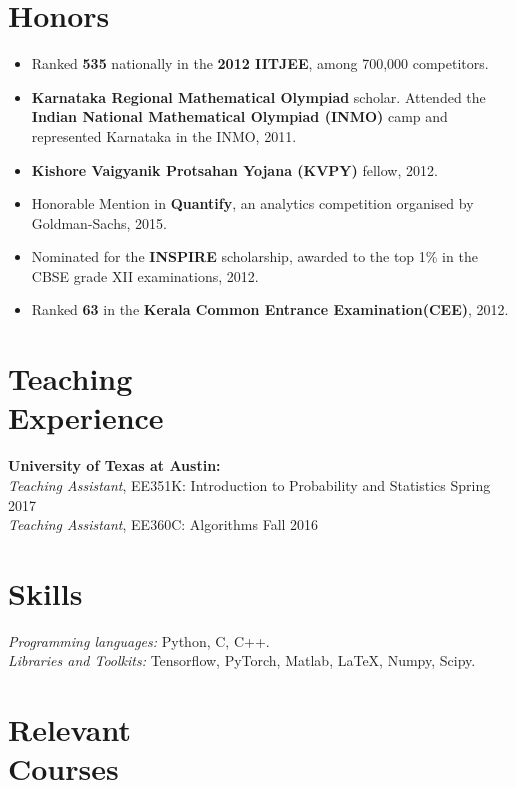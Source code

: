 \documentclass[margin, 11pt]{res} %
\begin{document}
\begin{resume}

\section{\large Honors}
\begin{itemize}\itemsep -2pt
	\item Ranked {\bf 535} nationally in the {\bf 2012 IITJEE}, among 700,000 competitors.
	\item {\bf Karnataka Regional Mathematical Olympiad} scholar. Attended the {\bf Indian National Mathematical Olympiad (INMO)} camp and represented Karnataka
	in the INMO, 2011.
	\item {\bf Kishore Vaigyanik Protsahan Yojana (KVPY)} fellow, 2012.
	\item Honorable Mention in {\bf Quantify}, an analytics competition organised by Goldman-Sachs,
	2015.
	\item Nominated for the {\bf INSPIRE} scholarship, awarded to the top 1\% in the CBSE grade XII
	examinations, 2012.
	\item Ranked {\bf 63} in the {\bf Kerala Common Entrance Examination(CEE)}, 2012.
\end{itemize}

\section{\large Teaching \\ Experience}
{\bf University of Texas at Austin:}\\
{\sl Teaching Assistant}, EE351K: Introduction to Probability and Statistics \hfill Spring 2017\\
{\sl Teaching Assistant}, EE360C: Algorithms \hfill Fall 2016

\section{\large Skills}
{\sl Programming languages:} Python, C, C++.\\
{\sl Libraries and Toolkits:} Tensorflow, PyTorch, Matlab, \LaTeX, Numpy, Scipy.

\section{\large Relevant \\ Courses}


\end{resume}
\end{document}

